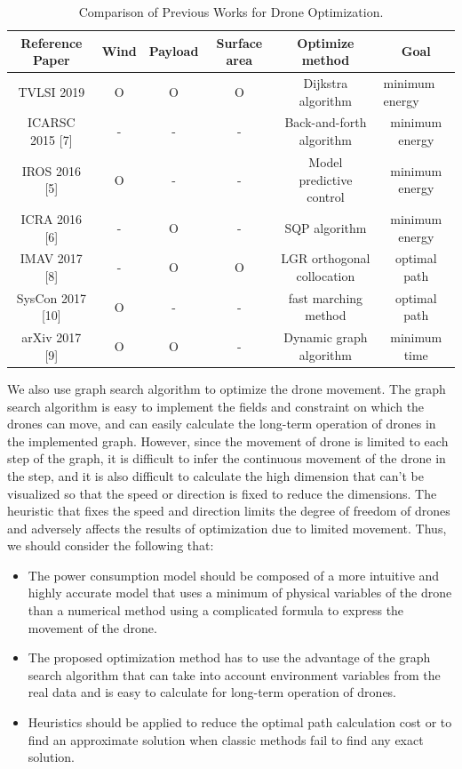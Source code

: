 \documentclass[journal]{./template/IEEEtran}
\begin{document}
\begin{table}[ht]
\caption{Comparison of Previous Works for Drone Optimization.}
\label{Table: survay_result}
\centering
\begin{tabular}{|c|c|c|c|c|c|}
\hline
Reference Paper & Wind & Payload & Surface area & Optimize method & Goal \\ \hline
TVLSI 2019 & O & O & O & Dijkstra algorithm & \multicolumn{1}{l|}{minimum energy} \\ \hline
ICARSC 2015 {[}7{]} & - & - & - & Back-and-forth algorithm & minimum energy \\ \hline
IROS 2016 {[}5{]} & O  & - & - & Model predictive control & minimum energy \\ \hline
ICRA 2016 {[}6{]} & - & O & - & SQP algorithm & minimum energy \\ \hline
IMAV 2017 {[}8{]} & - & O & O & LGR orthogonal collocation & optimal path \\ \hline
SysCon 2017 {[}10{]} & O & - & - & fast marching method & optimal path \\ \hline
arXiv 2017 {[}9{]} & O & O & - & Dynamic graph algorithm & minimum time \\ \hline
\end{tabular}
\end{table}

We also use graph search algorithm to optimize the drone movement. The graph search algorithm is easy to implement the fields and constraint on which the drones can move, and can easily calculate the long-term operation of drones in the implemented graph.
However, since the movement of drone is limited to each step of the graph, it is difficult to infer the continuous movement of the drone in the step, and it is also difficult to calculate the high dimension that can’t be visualized so that the speed or direction is fixed to reduce the dimensions.
The heuristic that fixes the speed and direction limits the degree of freedom of drones and adversely affects the results of optimization due to limited movement.
Thus, we should consider the following that: 
\begin{itemize}
    \item The power consumption model should be composed of a more intuitive and highly accurate model that uses a minimum of physical variables of the drone than a numerical method using a complicated formula to express the movement of the drone.
    \item The proposed optimization method has to use the advantage of the graph search algorithm that can take into account environment variables from the real data and is easy to calculate for long-term operation of drones.
    \item Heuristics should be applied to reduce the optimal path calculation cost or to find an approximate solution when classic methods fail to find any exact solution.
\end{itemize}
\end{document}
